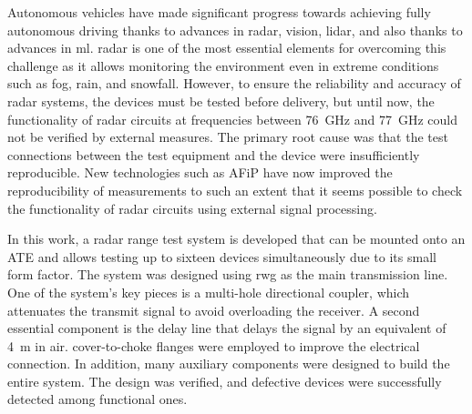 \cleardoubleoddpage%
\begin{abstract*}
	Autonomous vehicles have made significant progress towards achieving fully autonomous driving thanks to advances in \gls{radar}, vision, \gls{lidar}, and also thanks to advances in \gls{ml}. 
	\Gls{radar} is one of the most essential elements for overcoming this challenge as it allows monitoring the environment even in extreme conditions such as fog, rain, and snowfall. 
	However, to ensure the reliability and accuracy of \gls{radar} systems, the devices must be tested before delivery, but
	until now, the functionality of \gls{radar} circuits at frequencies between \SI{76}{\giga\hertz} and \SI{77}{\giga\hertz} could not be verified by external measures.
	The primary root cause was that the test connections between the test equipment and the device were insufficiently reproducible.
	New technologies such as \gls{AFiP} have now improved the reproducibility of measurements to such an extent that it seems possible to check the functionality of \gls{radar} circuits using external signal processing.
	
	In this work, a \gls{radar} range test system is developed that can be mounted onto an \gls{ATE} and allows testing up to sixteen devices simultaneously due to its small form factor. 
	The system was designed using \gls{rwg} as the main transmission line. 
	One of the system's key pieces is a multi-hole directional coupler, which attenuates the transmit signal to avoid overloading the receiver. 
	A second essential component is the delay line that delays the signal by an equivalent of \SI{4}{\meter} in air. 
	\Gls{cover-to-choke} flanges were employed to improve the electrical connection.
	In addition, many auxiliary components were designed to build the entire system. 
	The design was verified, and defective devices were successfully detected among functional ones. 
\end{abstract*} 


